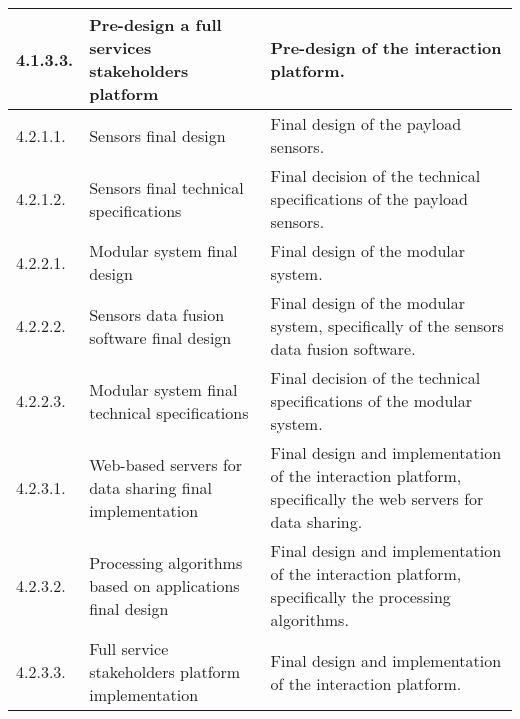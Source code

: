 \begin{longtable}[H]{l >{\raggedright\arraybackslash}p{4cm} p{8cm}}
	\midrule
	
	4.1.3.3. & Pre-design a full services stakeholders platform & Pre-design of the interaction platform.\vspace{0.2cm} \\
	
	\midrule
	
	4.2.1.1. & Sensors final design & Final design of the payload sensors.\vspace{0.2cm} \\
	
	\midrule
	
	4.2.1.2. & Sensors final technical specifications & Final decision of the technical specifications of the payload sensors.\vspace{0.2cm} \\
	
	\midrule
	
	4.2.2.1. & Modular system final design & Final design of the modular system.\vspace{0.2cm} \\
	
	\midrule
	
	4.2.2.2. & Sensors data fusion software final design  & Final design of the modular system, specifically of the sensors data fusion software.\vspace{0.2cm} \\
	
	\midrule
	
	4.2.2.3. & Modular system final technical specifications & Final decision of the technical specifications of the modular system.\vspace{0.2cm} \\

	\midrule
	
	4.2.3.1. & Web-based servers for data sharing final implementation & Final design and implementation of the interaction platform, specifically the web servers for data sharing.\vspace{0.2cm} \\
	
	\midrule
	
	4.2.3.2. & Processing algorithms based on applications final design & Final design and implementation of the interaction platform, specifically the processing algorithms.\vspace{0.2cm} \\
	
	\midrule
	
	4.2.3.3. & Full service stakeholders platform implementation & Final design and implementation of the interaction platform.\vspace{0.2cm} \\
	

\end{longtable}
